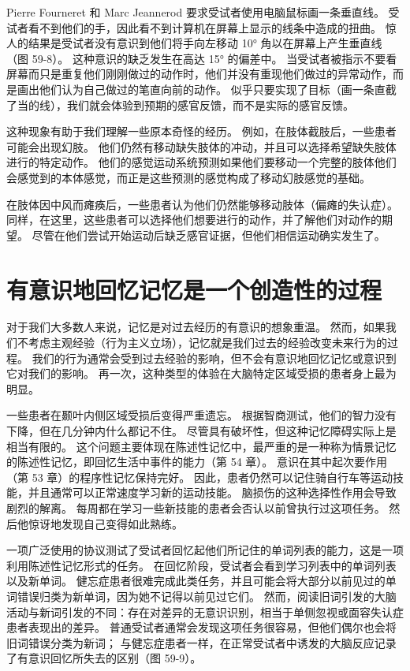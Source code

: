 Pierre Fourneret 和 Marc Jeannerod 要求受试者使用电脑鼠标画一条垂直线。 受试者看不到他们的手，因此看不到计算机在屏幕上显示的线条中造成的扭曲。 惊人的结果是受试者没有意识到他们将手向左移动 10° 角以在屏幕上产生垂直线（图 59-8）。 这种意识的缺乏发生在高达 15° 的偏差中。 当受试者被指示不要看屏幕而只是重复他们刚刚做过的动作时，他们并没有重现他们做过的异常动作，而是画出他们认为自己做过的笔直向前的动作。 似乎只要实现了目标（画一条直截了当的线），我们就会体验到预期的感官反馈，而不是实际的感官反馈。

这种现象有助于我们理解一些原本奇怪的经历。 例如，在肢体截肢后，一些患者可能会出现幻肢。 他们仍然有移动缺失肢体的冲动，并且可以选择希望缺失肢体进行的特定动作。 他们的感觉运动系统预测如果他们要移动一个完整的肢体他们会感觉到的本体感觉，而正是这些预测的感觉构成了移动幻肢感觉的基础。

在肢体因中风而瘫痪后，一些患者认为他们仍然能够移动肢体（偏瘫的失认症）。 同样，在这里，这些患者可以选择他们想要进行的动作，并了解他们对动作的期望。 尽管在他们尝试开始运动后缺乏感官证据，但他们相信运动确实发生了。


\section{有意识地回忆记忆是一个创造性的过程}
对于我们大多数人来说，记忆是对过去经历的有意识的想象重温。 然而，如果我们不考虑主观经验（行为主义立场），记忆就是我们过去的经验改变未来行为的过程。 我们的行为通常会受到过去经验的影响，但不会有意识地回忆记忆或意识到它对我们的影响。 再一次，这种类型的体验在大脑特定区域受损的患者身上最为明显。

一些患者在颞叶内侧区域受损后变得严重遗忘。 根据智商测试，他们的智力没有下降，但在几分钟内什么都记不住。 尽管具有破坏性，但这种记忆障碍实际上是相当有限的。 这个问题主要体现在陈述性记忆中，最严重的是一种称为情景记忆的陈述性记忆，即回忆生活中事件的能力（第 54 章）。 意识在其中起次要作用（第 53 章）的程序性记忆保持完好。 因此，患者仍然可以记住骑自行车等运动技能，并且通常可以正常速度学习新的运动技能。 脑损伤的这种选择性作用会导致剧烈的解离。 每周都在学习一些新技能的患者会否认以前曾执行过这项任务。 然后他惊讶地发现自己变得如此熟练。

一项广泛使用的协议测试了受试者回忆起他们所记住的单词列表的能力，这是一项利用陈述性记忆形式的任务。 在回忆阶段，受试者会看到学习列表中的单词列表以及新单词。 健忘症患者很难完成此类任务，并且可能会将大部分以前见过的单词错误归类为新单词，因为她不记得以前见过它们。 然而，阅读旧词引发的大脑活动与新词引发的不同：存在对差异的无意识识别，相当于单侧忽视或面容失认症患者表现出的差异。 普通受试者通常会发现这项任务很容易，但他们偶尔也会将旧词错误分类为新词； 与健忘症患者一样，在正常受试者中诱发的大脑反应记录了有意识回忆所失去的区别（图 59-9）。

